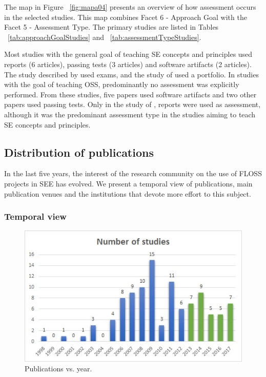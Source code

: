 The map in Figure ~\ref{fig:mapa04} presents
an overview of how assessment occurs in the selected studies.
This map combines Facet 6 - Approach Goal with the Facet 5 - Assessment Type.
The primary studies are listed in Tables ~\ref{tab:approachGoalStudies} and ~\ref{tab:assessmentTypeStudies}.

Most studies with the general goal of teaching SE concepts and principles 
used reports (6 articles), 
passing tests (3 articles) and software artifacts (2 articles). 
The study described by \citeauthor{id4811} used exams, and the study of \citeauthor{id4811} used a portfolio. 
In studies with the goal of teaching OSS, predominantly no assessment was explicitly performed. 
From these studies, five papers used software artifacts and two other papers used passing tests. 
Only in the study of \citeauthor{id5335}, reports were used as assessment, 
although it was the predominant assessment type in the studies 
aiming to teach SE concepts and principles.

\subsection{Distribution of publications}

In the last five years, the interest of the research community
on the use of FLOSS projects in SEE has evolved. 
We present a temporal view of publications, main publication venues and the institutions that devote more effort to this subject.

\subsubsection{Temporal view}

\begin{figure}[ht]
\includegraphics[width=\linewidth]{fig/number_of_studies.jpeg}
\caption{Publications vs. year.} \label{fig:publicationsvsyear}
\end{figure}

